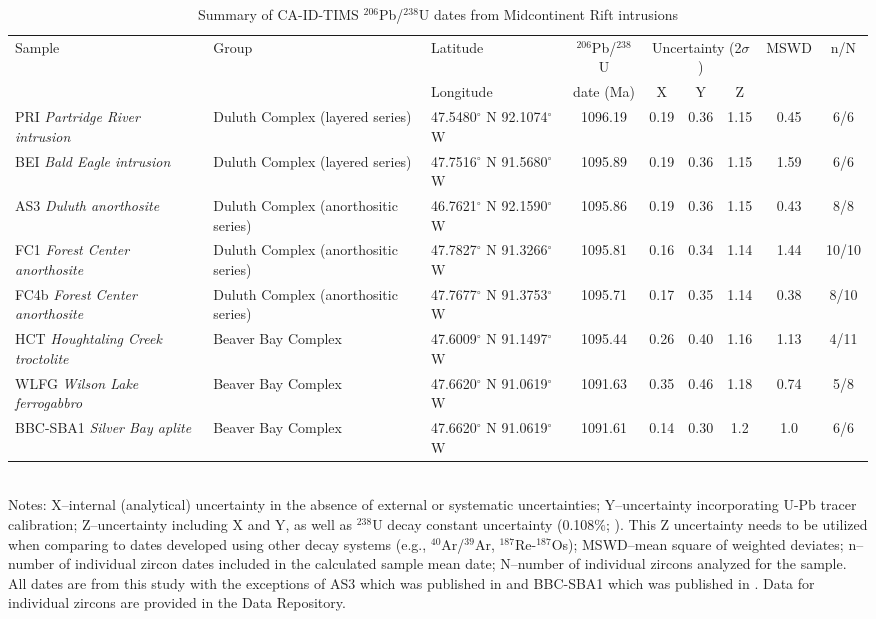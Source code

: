 \documentclass[11pt,letterpaper]{article}
\begin{document}
\begin{table}[h!]
\footnotesize
\caption{Summary of CA-ID-TIMS $^{206}$Pb/$^{238}$U dates from Midcontinent Rift intrusions}
\begin{tabular}{|p{3 cm}|p{3 cm}|p{1.8 cm}|c|ccc|c|c|}
\hline
Sample & Group & Latitude & $^{206}$Pb/$^{238}$U & \multicolumn{3}{|c|}{Uncertainty (2$\sigma$)} & MSWD & n/N \\
 &  & Longitude & date (Ma) & X & Y & Z & & \\
\hline
PRI \textit{Partridge River intrusion} & Duluth Complex (layered series) & 47.5480$^{\circ}$ N 92.1074$^{\circ}$ W & 1096.19 & 0.19 & 0.36 & 1.15 & 0.45 & 6/6 \\
\hline
BEI \textit{Bald Eagle intrusion} & Duluth Complex (layered series) & 47.7516$^{\circ}$ N 91.5680$^{\circ}$ W & 1095.89 & 0.19 & 0.36 & 1.15 & 1.59 & 6/6 \\
\hline
AS3 \textit{Duluth anorthosite} & Duluth Complex (anorthositic series) & 46.7621$^{\circ}$ N 92.1590$^{\circ}$ W & 1095.86 & 0.19 & 0.36 & 1.15 & 0.43 & 8/8 \\
\hline
FC1 \textit{Forest Center anorthosite} & Duluth Complex (anorthositic series) & 47.7827$^{\circ}$ N 91.3266$^{\circ}$ W & 1095.81 & 0.16 & 0.34 & 1.14 & 1.44 & 10/10 \\
\hline
FC4b \textit{Forest Center anorthosite} & Duluth Complex (anorthositic series) & 47.7677$^{\circ}$ N 91.3753$^{\circ}$ W & 1095.71 & 0.17 & 0.35 & 1.14 & 0.38 & 8/10 \\
\hline
HCT \textit{Houghtaling Creek troctolite} & Beaver Bay Complex & 47.6009$^{\circ}$ N 91.1497$^{\circ}$ W & 1095.44 & 0.26 & 0.40 & 1.16 & 1.13 & 4/11  \\
\hline
WLFG \textit{Wilson Lake ferrogabbro} & Beaver Bay Complex & 47.6620$^{\circ}$ N 91.0619$^{\circ}$ W & 1091.63 & 0.35 & 0.46 & 1.18 & 0.74 & 5/8 \\
\hline
BBC-SBA1 \textit{Silver Bay aplite} & Beaver Bay Complex & 47.6620$^{\circ}$ N 91.0619$^{\circ}$ W & 1091.61 & 0.14 & 0.30 & 1.2 & 1.0 & 6/6 \\
\hline
\end{tabular}\\
Notes: X--internal (analytical) uncertainty in the absence of external or systematic uncertainties; Y--uncertainty incorporating U-Pb tracer calibration; Z--uncertainty including X and Y, as well as $^{238}$U decay constant uncertainty (0.108$\%$; \citealp{Jaffey1971a}). This Z uncertainty needs to be utilized when comparing to dates developed using other decay systems (e.g., $^{40}$Ar/$^{39}$Ar, $^{187}$Re-$^{187}$Os); MSWD--mean square of weighted deviates; n--number of individual zircon dates included in the calculated sample mean date; N--number of individual zircons analyzed for the sample. All dates are from this study with the exceptions of AS3 which was published in \cite{Schoene2006a} and BBC-SBA1 which was published in \cite{Fairchild2017a}. Data for individual zircons are provided in the Data Repository.
\label{tab:geochron}
\end{table}
\end{document}
